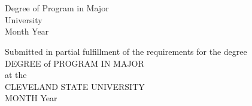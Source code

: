 \newpage
\thispagestyle{empty}

\begin{center}
  \vfill

  \MakeUppercase{\@title}\\
  \vfill
 
  \MakeUppercase{\@author}\\
  \bigskip
  Degree of Program in Major\\
  University\\
  Month Year
  \vspace*{\fill}

  Submitted in partial fulfillment of the requirements for the degree\\
  DEGREE of PROGRAM IN MAJOR\\
  at the\\
  CLEVELAND STATE UNIVERSITY\\
  MONTH Year\\
\end{center}